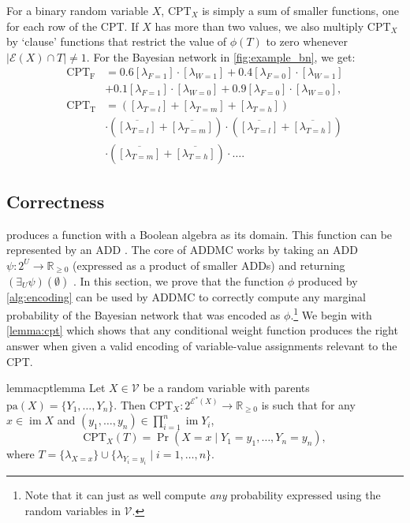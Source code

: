 \documentclass{article}
\DeclareMathOperator{\im}{im}
\begin{document}
For a binary random variable $X$, $\mathrm{CPT}_X$ is simply a sum of smaller
functions, one for each row of the CPT. If $X$ has more than two values, we also
multiply $\mathrm{CPT}_X$ by `clause' functions that restrict the value of
$\phi(T)$ to zero whenever $|\mathcal{E}(X) \cap T| \ne 1$. For the Bayesian
network in \cref{fig:example_bn}, we get:
\begin{align*}
  \mathrm{CPT_F} &= 0.6[\lambda_{F=1}] \cdot [\lambda_{W=1}] + 0.4[\lambda_{F=0}] \cdot [\lambda_{W=1}] \\
                 &+ 0.1[\lambda_{F=1}] \cdot [\lambda_{W=0}] + 0.9[\lambda_{F=0}] \cdot [\lambda_{W=0}], \\
  \mathrm{CPT_T} &= ([\lambda_{T=l}] + [\lambda_{T=m}] + [\lambda_{T=h}]) \\
                 &\cdot (\overline{[\lambda_{T=l}]} + \overline{[\lambda_{T=m}]}) \cdot (\overline{[\lambda_{T=l}]} + \overline{[\lambda_{T=h}]}) \\
                 &\cdot (\overline{[\lambda_{T=m}]} + \overline{[\lambda_{T=h}]}) \cdot \dots.
\end{align*}

\subsection{Correctness}

 produces a function with a Boolean algebra as its domain.
This function can be represented by an ADD
\cite{DBLP:journals/fmsd/BaharFGHMPS97}. The core of ADDMC works by taking an
ADD $\psi\colon 2^{U} \to \mathbb{R}_{\ge 0}$ (expressed as a product of smaller
ADDs) and returning $(\exists_U\psi)(\emptyset)$
\cite{DBLP:conf/aaai/DudekPV20}. In this section, we prove that the function
$\phi$ produced by \cref{alg:encoding} can be used by ADDMC to correctly compute
any marginal probability of the Bayesian network that was encoded as
$\phi$.\footnote{Note that it can just as well compute \emph{any} probability
  expressed using the random variables in $\mathcal{V}$.} We begin with
\cref{lemma:cpt} which shows that any conditional weight function produces the
right answer when given a valid encoding of variable-value assignments relevant
to the CPT.

\begin{restatable}{lemma}{cptlemma} \label{lemma:cpt}
  Let $X \in \mathcal{V}$ be a random variable with parents $\mathrm{pa}(X) = \{ Y_1,
  \dots, Y_n \}$. Then $\mathrm{CPT}_X\colon 2^{\mathcal{E}^*(X)} \to
  \mathbb{R}_{\ge 0}$ is such that for any $x \in \im X$ and $(y_1, \dots, y_n)
  \in \prod_{i=1}^n \im Y_i$,
  \[
    \mathrm{CPT}_X (T) = \Pr(X = x \mid Y_1 = y_1, \dots, Y_n = y_n),
  \]
  where $T = \{ \lambda_{X=x} \} \cup \{ \lambda_{Y_i=y_i} \mid i = 1, \dots, n
  \}$.
\end{restatable}
\end{document}
